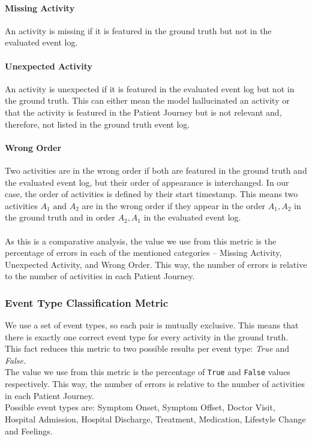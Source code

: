 \paragraph{Missing Activity} An activity is missing if it is featured in the ground truth but not in the evaluated event log. 
\paragraph{Unexpected Activity} An activity is unexpected if it is featured in the evaluated event log but not in the ground truth. This can either mean the model hallucinated an activity or that the activity is featured in the Patient Journey but is not relevant and, therefore, not listed in the ground truth event log.
\paragraph{Wrong Order} Two activities are in the wrong order if both are featured in the ground truth and the evaluated event log, but their order of appearance is interchanged. In our case, the order of activities is defined by their start timestamp. This means two activities $A_1 \text{ and } A_2$ are in the wrong order if they appear in the order $A_1,A_2$ in the ground truth and in order $A_2, A_1$ in the evaluated event log.\\\\
As this is a comparative analysis, the value we use from this metric is the percentage of errors in each of the mentioned categories – Missing Activity, Unexpected Activity, and Wrong Order. This way, the number of errors is relative to the number of activities in each Patient Journey.

\subsubsection{Event Type Classification Metric}\label{sec:eventtype_metric}
We use a set of event types, so each pair is mutually exclusive. This means that there is exactly one correct event type for every activity in the ground truth. This fact reduces this metric to two possible results per event type: \emph{True} and \emph{False.}\\
The value we use from this metric is the percentage of \verb|True| and \verb|False| values respectively. This way, the number of errors is relative to the number of activities in each Patient Journey.\\
Possible event types are: Symptom Onset, Symptom Offset, Doctor Visit, Hospital Admission, Hospital Discharge, Treatment, Medication, Lifestyle Change and Feelings.

